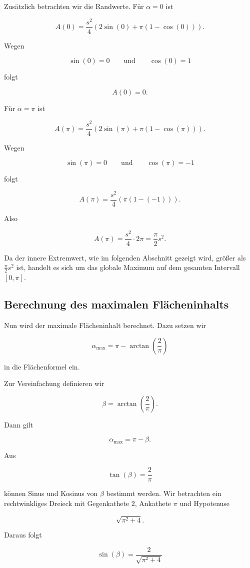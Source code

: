 Zusätzlich betrachten wir die Randwerte. Für \(\alpha=0\) ist

\[
A(0)
=
\frac{s^2}{4}
\left(
2\sin(0)
+
\pi(1-\cos(0))
\right).
\]

Wegen

\[
\sin(0)=0
\qquad \text{und} \qquad
\cos(0)=1
\]

folgt

\[
A(0)=0.
\]

Für \(\alpha=\pi\) ist

\[
A(\pi)
=
\frac{s^2}{4}
\left(
2\sin(\pi)
+
\pi(1-\cos(\pi))
\right).
\]

Wegen

\[
\sin(\pi)=0
\qquad \text{und} \qquad
\cos(\pi)=-1
\]

folgt

\[
A(\pi)
=
\frac{s^2}{4}
\left(
\pi(1-(-1))
\right).
\]

Also

\[
A(\pi)
=
\frac{s^2}{4}\cdot 2\pi
=
\frac{\pi}{2}s^2.
\]

Da der innere Extremwert, wie im folgenden Abschnitt gezeigt wird,
größer als \(\frac{\pi}{2}s^2\) ist, handelt es sich um das globale
Maximum auf dem gesamten Intervall \([0,\pi]\).

\subsection{Berechnung des maximalen Flächeninhalts}

Nun wird der maximale Flächeninhalt berechnet. Dazu setzen wir

\[
\alpha_\text{max}
=
\pi
-
\arctan\left(\frac{2}{\pi}\right)
\]

in die Flächenformel ein.

Zur Vereinfachung definieren wir

\[
\beta
=
\arctan\left(\frac{2}{\pi}\right).
\]

Dann gilt

\[
\alpha_\text{max}
=
\pi-\beta.
\]

Aus

\[
\tan(\beta)
=
\frac{2}{\pi}
\]

können Sinus und Kosinus von \(\beta\) bestimmt werden. Wir betrachten ein
rechtwinkliges Dreieck mit Gegenkathete \(2\), Ankathete \(\pi\) und
Hypotenuse

\[
\sqrt{\pi^2+4}.
\]

Daraus folgt

\[
\sin(\beta)
=
\frac{2}{\sqrt{\pi^2+4}}
\]

